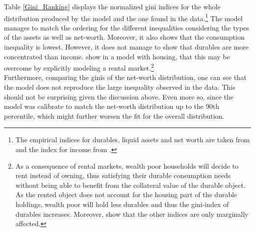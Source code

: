 \documentclass[a4paper,12pt,legno]{article}
\begin{document}
Table \ref{Gini_Ranking} displays the normalized \citep{chen1982} gini indices for the whole distribution produced by the model and the one found in the data.\footnote{The empirical indices for durables, liquid assets and net worth are taken from \cite{hintermaier2010} and the index for income from \cite{hintermaier2011}.} The model manages to match the ordering for the different inequalities considering the types of the assets as well as net-worth. Moreover, it also shows that the consumption inequality is lowest. However, it does not manage to show that durables are more concentrated than income. \cite{diaz2010} show in a model with housing, that this may be overcome by explicitly modeling a rental market.\footnote{As a consequence of rental markets, wealth poor households will decide to rent instead of owning, thus satisfying their durable consumption needs without being able to benefit from the collateral value of the durable object. As the rented object does not account for the housing part of the durable holdings, wealth poor will hold less durables and thus the gini-index of durables increases. Moreover, \cite{diaz2010} show that the other indices are only marginally affected.} \\
Furthermore, comparing the ginis of the net-worth distribution, one can see that the model does not reproduce the large inequality observed in the data. This should not be surprising given the discussion above. Even more so, since the model was calibrate to match the net-worth distribution up to the 90th percentile, which might further worsen the fit for the overall distribution.  
\end{document}
